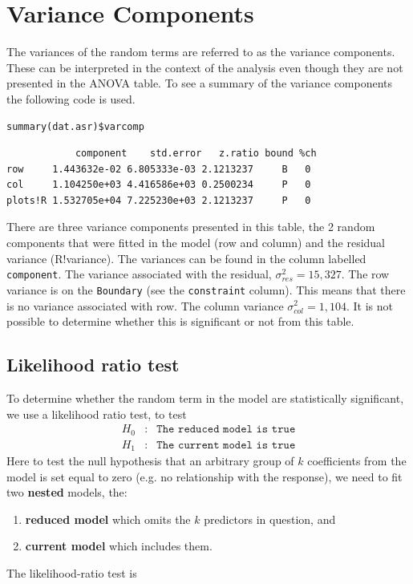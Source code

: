\documentclass[a4paper, 10pt, fleqn, twosided]{memoir}
\begin{document}
\clearpage
\section{Variance Components}

The variances of the random terms are referred to as the variance components. These can be interpreted in the context
of the analysis even though they are not presented in the ANOVA table. To see a summary of the variance components the
following code is used.

\begin{tcolorbox}[title = Example 4 Graph of predicted values]
\begin{verbatim}
summary(dat.asr)$varcomp
\end{verbatim}
\end{tcolorbox}

\begin{tcolorbox}[title = Example 4 Tukey's multiple comparison output]
\begin{verbatim}
            component    std.error   z.ratio bound %ch
row     1.443632e-02 6.805333e-03 2.1213237     B   0
col     1.104250e+03 4.416586e+03 0.2500234     P   0
plots!R 1.532705e+04 7.225230e+03 2.1213237     P   0

\end{verbatim}
\end{tcolorbox}

There are three variance components presented in this table, the 2 random components that were fitted in the model (row
and column) and the residual variance (R!variance). The variances can be found in the column labelled
\texttt{component}. The variance associated with the residual, $\sigma^2_{res} = 15,327$. The row variance is on the
\texttt{Boundary} (see the \texttt{constraint} column). This means that there is no variance associated with row. The
column variance $\sigma^2_{col} = 1,104$. It is not possible to determine whether this is significant or not from this
table.

\subsection{Likelihood ratio test}

To determine whether the random term in the model are statistically significant, we use a likelihood ratio test, to
test
\begin{eqnarray*}
	H_0&:& \texttt{The reduced model is true} \\
	H_1&:& \texttt{The current model is true}
\end{eqnarray*}
Here to test the null hypothesis that an arbitrary group of $k$ coefficients from the model is set equal to zero (e.g.
no relationship with the response), we need to fit two \textbf{nested} models, the:
\begin{enumerate}
\item \textbf{reduced model} which omits the $k$ predictors in question, and
\item \textbf{current model} which includes them.
\end{enumerate}
The likelihood-ratio test is
\end{document}

